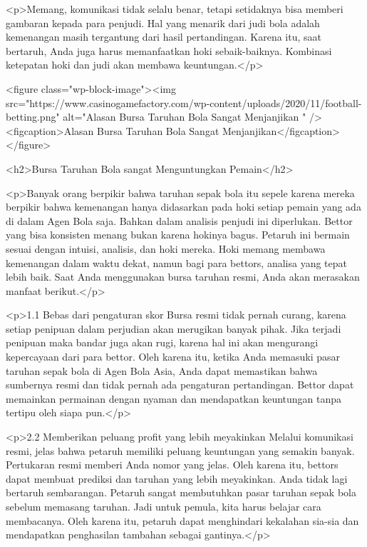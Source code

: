 <p>Memang, komunikasi tidak selalu benar, tetapi setidaknya bisa memberi gambaran kepada para penjudi. Hal yang menarik dari judi bola adalah kemenangan masih tergantung dari hasil pertandingan. Karena itu, saat bertaruh, Anda juga harus memanfaatkan hoki sebaik-baiknya. Kombinasi ketepatan hoki dan judi akan membawa keuntungan.</p>



<figure class="wp-block-image"><img src="https://www.casinogamefactory.com/wp-content/uploads/2020/11/football-betting.png" alt="Alasan Bursa Taruhan Bola Sangat Menjanjikan  " /><figcaption>Alasan Bursa Taruhan Bola Sangat Menjanjikan</figcaption></figure>



<h2>Bursa Taruhan Bola sangat Menguntungkan Pemain</h2>



<p>Banyak orang berpikir bahwa taruhan sepak bola itu sepele karena mereka berpikir bahwa kemenangan hanya didasarkan pada hoki setiap pemain yang ada di dalam Agen Bola saja. Bahkan dalam analisis penjudi ini diperlukan. Bettor yang bisa konsisten menang bukan karena hokinya bagus. Petaruh ini bermain sesuai dengan intuisi, analisis, dan hoki mereka. Hoki memang membawa kemenangan dalam waktu dekat, namun bagi para bettors, analisa yang tepat lebih baik. Saat Anda menggunakan bursa taruhan resmi, Anda akan merasakan manfaat berikut.</p>



<p>1.1 Bebas dari pengaturan skor Bursa resmi tidak pernah curang, karena setiap penipuan dalam perjudian akan merugikan banyak pihak. Jika terjadi penipuan maka bandar juga akan rugi, karena hal ini akan mengurangi kepercayaan dari para bettor. Oleh karena itu, ketika Anda memasuki pasar taruhan sepak bola di Agen Bola Asia, Anda dapat memastikan bahwa sumbernya resmi dan tidak pernah ada pengaturan pertandingan. Bettor dapat memainkan permainan dengan nyaman dan mendapatkan keuntungan tanpa tertipu oleh siapa pun.</p>



<p>2.2 Memberikan peluang profit yang lebih meyakinkan Melalui komunikasi resmi, jelas bahwa petaruh memiliki peluang keuntungan yang semakin banyak. Pertukaran resmi memberi Anda nomor yang jelas. Oleh karena itu, bettors dapat membuat prediksi dan taruhan yang lebih meyakinkan. Anda tidak lagi bertaruh sembarangan. Petaruh sangat membutuhkan pasar taruhan sepak bola sebelum memasang taruhan. Jadi untuk pemula, kita harus belajar cara membacanya. Oleh karena itu, petaruh dapat menghindari kekalahan sia-sia dan mendapatkan penghasilan tambahan sebagai gantinya.</p>



